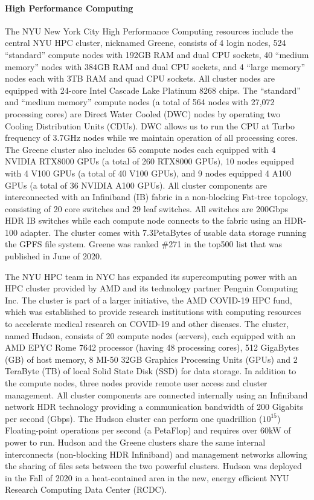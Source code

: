 \paragraph{High Performance Computing}
The NYU New York City High Performance Computing resources include the central NYU HPC cluster, nicknamed Greene, consists of 4 login nodes, 524 “standard'' compute nodes with 192GB RAM and dual CPU sockets, 40 “medium memory” nodes with 384GB RAM and dual CPU sockets, and 4 “large memory” nodes each with 3TB RAM and quad CPU sockets. All cluster nodes are equipped with 24-core Intel Cascade Lake Platinum 8268 chips. The “standard” and “medium memory” compute nodes (a total of 564 nodes with 27,072 processing cores) are Direct Water Cooled (DWC) nodes by operating two Cooling Distribution Units (CDUs). DWC allows us to run the CPU at Turbo frequency of 3.7GHz nodes while we maintain operation of all processing cores. The Greene cluster also includes 65 compute nodes each equipped with 4 NVIDIA RTX8000 GPUs (a total of 260 RTX8000 GPUs), 10 nodes equipped with 4 V100 GPUs (a total of 40 V100 GPUs), and 9 nodes equipped 4 A100 GPUs (a total of 36 NVIDIA A100 GPUs). All cluster components are interconnected with an Infiniband (IB) fabric in a non-blocking Fat-tree topology, consisting of 20 core switches and 29 leaf switches. All switches are 200Gbps HDR IB switches while each compute node connects to the fabric using an HDR-100 adapter. The cluster comes with 7.3PetaBytes of usable data storage running the GPFS file system. Greene was ranked \#271 in the top500 list that was published in June of 2020.

The NYU HPC team in NYC has expanded its supercomputing power with an HPC cluster provided by AMD and its technology partner Penguin Computing Inc. The cluster is part of a larger initiative, the AMD COVID-19 HPC fund, which was established to provide research institutions with computing resources to accelerate medical research on COVID-19 and other diseases. The cluster, named Hudson, consists of 20 compute nodes (servers), each equipped with an AMD EPYC Rome 7642 processor (having 48 processing cores), 512 GigaBytes (GB) of host memory, 8 MI-50 32GB Graphics Processing Units (GPUs) and 2 TeraByte (TB) of local Solid State Disk (SSD) for data storage. In addition to the compute nodes, three nodes provide remote user access and cluster management. All cluster components are connected internally using an Infiniband network HDR technology providing a communication bandwidth of 200 Gigabits per second (Gbps). The Hudson cluster can perform one quadrillion ($10^15$) Floating-point operations per second (a PetaFlop) and requires over 60kW of power to run. Hudson and the Greene clusters share the same internal interconnects (non-blocking HDR Infiniband) and management networks allowing the sharing of files sets between the two powerful clusters. Hudson was deployed in the Fall of 2020  in a heat-contained area in the new, energy efficient NYU Research Computing Data Center (RCDC).

